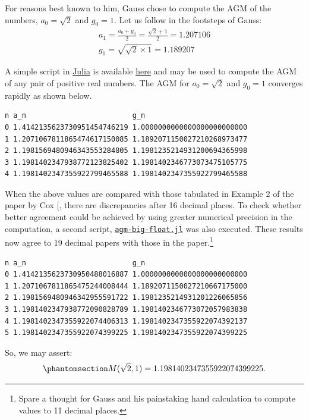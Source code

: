 \documentclass[
  a4paper,
]{article}
\begin{document}
For reasons best known to him, Gauss chose to compute the AGM of the
numbers, \(a_0 = \sqrt{2}\) and \(g_0 = 1\). Let us follow in the
footsteps of Gauss: \[
\begin{aligned}
a_1 = \frac{a_0 + g_0}{2} = \frac{\sqrt{2} + 1}{2} = 1.207106\\
g_1 = \sqrt{\sqrt{2} \times 1} = 1.189207
\end{aligned}
\]

A simple script in \href{https://julialang.org/}{Julia} is available
\href{auxiliary/agm-float.jl}{here} and may be used to compute the AGM
of any pair of positive real numbers. The AGM for \(a_0 = \sqrt{2}\) and
\(g_0 = 1\) converges rapidly as shown below.

\begin{verbatim}
n a_n                         g_n
0 1.4142135623730951454746219 1.0000000000000000000000000
1 1.2071067811865474617150085 1.1892071150027210268973477
2 1.1981569480946343553284805 1.1981235214931200694365998
3 1.1981402347938772123825402 1.1981402346773073475105775
4 1.1981402347355922799465588 1.1981402347355922799465588
\end{verbatim}

When the above values are compared with those tabulated in Example 2 of
the paper by Cox {[}\citeproc{ref-cox-1984}{32}{]}, there are
discrepancies after 16 decimal places. To check whether better agreement
could be achieved by using greater numerical precision in the
computation, a second script,
\href{auxiliary/agm-big-float.jl}{\texttt{agm-big-float.jl}} was also
executed. These results now agree to 19 decimal papers with those in the
paper.\footnote{Spare a thought for Gauss and his painstaking hand
  calculation to compute values to 11 decimal places.}

\begin{verbatim}
n a_n                         g_n
0 1.4142135623730950488016887 1.0000000000000000000000000
1 1.2071067811865475244008444 1.1892071150027210667175000
2 1.1981569480946342955591722 1.1981235214931201226065856
3 1.1981402347938772090828789 1.1981402346773072057983838
4 1.1981402347355922074406313 1.1981402347355922074392137
5 1.1981402347355922074399225 1.1981402347355922074399225
\end{verbatim}

So, we may assert:
\begin{equation}\phantomsection\label{eq:agm-root2-one}{
M(\sqrt{2}, 1) = 1.1981402347355922074399225.
}\end{equation}
\end{document}
